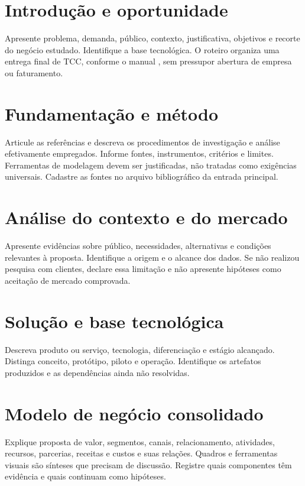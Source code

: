 \chapter{Introdução e oportunidade}
Apresente problema, demanda, público, contexto, justificativa, objetivos e
recorte do negócio estudado. Identifique a base tecnológica. O roteiro
organiza uma entrega final de TCC, conforme o manual ,
sem pressupor abertura de empresa ou faturamento.

\chapter{Fundamentação e método}
Articule as referências e descreva os procedimentos de investigação e análise
efetivamente empregados. Informe fontes, instrumentos, critérios e limites.
Ferramentas de modelagem devem ser justificadas, não tratadas como exigências
universais. Cadastre as fontes no arquivo bibliográfico da entrada principal.

\chapter{Análise do contexto e do mercado}
Apresente evidências sobre público, necessidades, alternativas e condições
relevantes à proposta. Identifique a origem e o alcance dos dados. Se não
realizou pesquisa com clientes, declare essa limitação e não apresente
hipóteses como aceitação de mercado comprovada.

\chapter{Solução e base tecnológica}
Descreva produto ou serviço, tecnologia, diferenciação e estágio alcançado.
Distinga conceito, protótipo, piloto e operação. Identifique os artefatos
produzidos e as dependências ainda não resolvidas.

\chapter{Modelo de negócio consolidado}
Explique proposta de valor, segmentos, canais, relacionamento, atividades,
recursos, parcerias, receitas e custos e suas relações. Quadros e ferramentas
visuais são sínteses que precisam de discussão. Registre quais componentes
têm evidência e quais continuam como hipóteses.

